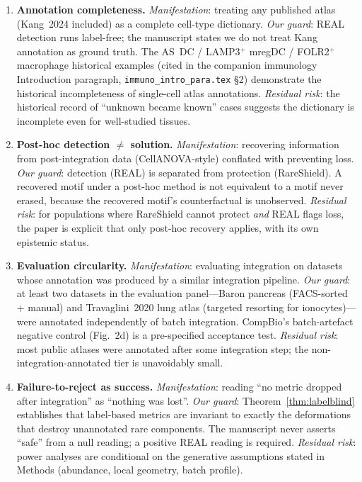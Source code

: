 \begin{enumerate}[label=\textbf{S0.\arabic*}, leftmargin=*]
  \item \textbf{Annotation completeness.}
    \emph{Manifestation}: treating any published atlas (Kang~2024 included) as a complete cell-type dictionary.
    \emph{Our guard}: REAL detection runs label-free; the manuscript states we do not treat Kang annotation as ground truth. The AS~DC / LAMP3$^+$ mregDC / FOLR2$^+$ macrophage historical examples (cited in the companion immunology Introduction paragraph, \texttt{immuno\_intro\_para.tex} \S2) demonstrate the historical incompleteness of single-cell atlas annotations.
    \emph{Residual risk}: the historical record of ``unknown became known'' cases suggests the dictionary is incomplete even for well-studied tissues.

  \item \textbf{Post-hoc detection $\neq$ solution.}
    \emph{Manifestation}: recovering information from post-integration data (CellANOVA-style) conflated with preventing loss.
    \emph{Our guard}: detection (REAL) is separated from protection (RareShield). A recovered motif under a post-hoc method is not equivalent to a motif never erased, because the recovered motif's counterfactual is unobserved.
    \emph{Residual risk}: for populations where RareShield cannot protect \emph{and} REAL flags loss, the paper is explicit that only post-hoc recovery applies, with its own epistemic status.

  \item \textbf{Evaluation circularity.}
    \emph{Manifestation}: evaluating integration on datasets whose annotation was produced by a similar integration pipeline.
    \emph{Our guard}: at least two datasets in the evaluation panel---Baron pancreas (FACS-sorted + manual) and Travaglini~2020 lung atlas (targeted resorting for ionocytes)---were annotated independently of batch integration. CompBio's batch-artefact negative control (Fig.~2d) is a pre-specified acceptance test.
    \emph{Residual risk}: most public atlases were annotated after some integration step; the non-integration-annotated tier is unavoidably small.

  \item \textbf{Failure-to-reject as success.}
    \emph{Manifestation}: reading ``no metric dropped after integration'' as ``nothing was lost''.
    \emph{Our guard}: Theorem~\ref{thm:labelblind} establishes that label-based metrics are invariant to exactly the deformations that destroy unannotated rare components. The manuscript never asserts ``safe'' from a null reading; a positive REAL reading is required.
    \emph{Residual risk}: power analyses are conditional on the generative assumptions stated in Methods (abundance, local geometry, batch profile).
\end{enumerate}

